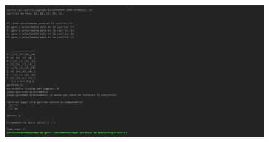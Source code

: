 \documentclass[12pt, Tahoma]{article}
\begin{document}
	\begin{figure}[H]
		\centering
		\includegraphics[scale=0.3]{Resultados7.png}
	\end{figure}
	
\end{document}
